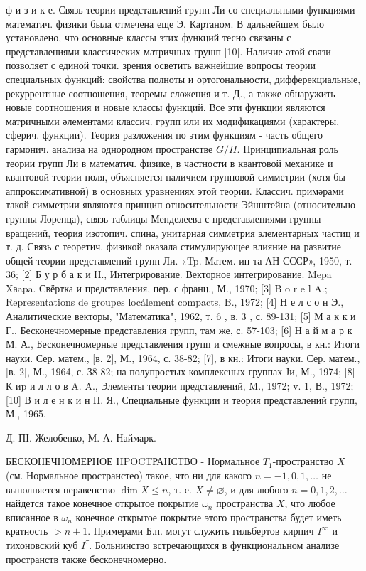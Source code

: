 \documentclass[10pt]{article}
\begin{document}
ф и з и к е. Связь теории представлений групп Ли со специальными функциями математич. физики была отмечена еще Э. Картаном. В дальнейшем было установлено, что основные классы этих функций тесно связаны с представлениями классических матричных грушп [10]. Наличие әтой связи позволяет с единой точки. зрения осветить важнейшие вопросы теории специальных функций: свойства полноты и ортогональности, дифферекциальные, рекуррентные соотношения, теоремы сложения и т. Д., а также обнаружить новые соотношения и новые классы функций. Все эти функции являются матричными әлементами классич. групп или их модификациями (характеры, сферич. функции). Теория разложения по этим функциям - часть общего гармонич. анализа на однородном пространстве $G / H$. Принципиальная роль теории групп Ли в математич. физике, в частности в квантовой механике и квантовой теории поля, объясняется наличием групповой симметрии (хотя бы аппроксимативной) в основных уравнениях этой теории. Классич. примәрами такой симметрии являются принцип относительности Эйнштейна (относительно группы Лоренца), связь таблицы Менделеева с представлениями группы вращений, теория изотопич. спина, унитарная симметрия элементарных частиц и т. д. Связь с теоретич. физикой оказала стимулирующее влияние на развитие общей теории представлений групп Ли. «Tp. Матем. ин-та АН СССР», 1950, т. 36; [2] Б у р б а к и Н., Интегрирование. Векторное интегрирование. Mepa Xаapa. Свёртка и представления, пер. с франц., М., 1970; [3] B o r e l A.; Representations de groupes locálement compacts, B., 1972; [4] Н е л с о н Э., Аналитические векторы, "Математика", 1962, т. 6 , в. 3 , с. 89-131; [5] М а к к и Г., Бесконечномерные представления групп, там же, с. 57-103; [6] Н а й м а р к М. А., Бесконечномерные представления групп и смежные вопросы, в кн.: Итоги науки. Сер. матем., [в. 2], М., 1964, с. 38-82; [7], в кн.: Итоги науки. Сер. матем., [в. 2], М., 1964, с. З8-82; на полупростых комплексных группах Ји, М., 1974; [8] К иp и л л о в A. A., Элементы теории представлений, M., 1972; v. 1, В., 1972; [10] В и л е н к и н Н. Я., Специальные функции и теория представлений групп, М., 1965.



Д. ПІ. Желобенко, М. А. Наймарк.



БЕСКОНЕЧНОМЕРНОЕ IIPOCTРАНСТВО - Нормальное $T_{1}$-пространство $X$ (см. Нормальное пространстео) такое, что ни для какого $n=-1,0,1, \ldots$ не выполняется неравенство $\operatorname{dim} X \leqslant n$, т. е. $X \neq \varnothing$, и для любого $n=0,1,2, \ldots$ найдется такое конечное открытое покрытие $\omega_{n}$ пространства $X$, что любое вписанное в $\omega_{n}$ конечное открытое покрытие этого пространства будет иметь кратность $>n+1$. Примерами Б.п. могут служить гильбертов кирпич $I^{\infty}$ и тихоновский куб $I^{\tau}$. Больнинство встречающихся в функциональном анализе пространств также бесконечномерно.
\end{document}
